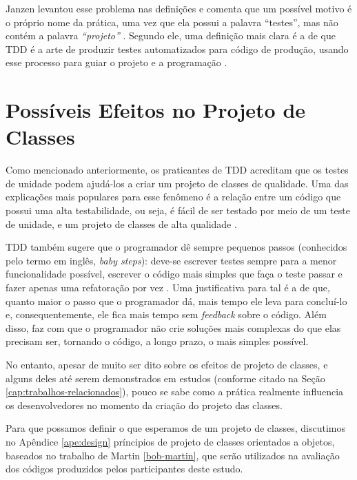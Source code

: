 Janzen levantou esse problema nas definições e comenta que um possível 
motivo é o próprio nome da prática, uma vez
que ela possui a palavra ``testes'', mas não contém a palavra \textit{``projeto''} 
\cite{tdd-really-improve}.
Segundo ele, uma definição mais clara é a de que TDD é a arte de produzir testes
automatizados para código de produção, usando esse processo para guiar o 
projeto e a programação \cite{agilealliance-tdd} \cite{tdd-taxonomy}.

\section{Possíveis Efeitos no Projeto de Classes}

Como mencionado anteriormente, os praticantes de TDD acreditam que os testes de unidade
podem ajudá-los a criar um projeto de classes de qualidade. Uma das explicações mais
populares para esse fenômeno é a relação
entre um código que possui uma alta testabilidade, ou seja, é fácil de ser testado
por meio de um teste de unidade, e um projeto de classes de alta qualidade \cite{feathers-synergy}.

TDD também sugere que o programador dê sempre pequenos passos (conhecidos pelo termo em
inglês, \textit{baby steps}): deve-se escrever testes sempre para a menor
funcionalidade possível, escrever o código mais simples que faça o teste passar
e fazer apenas uma refatoração por vez \cite{TDDByExample}.
Uma justificativa para tal é a de que, quanto maior o passo que o programador dá, mais
tempo ele leva para concluí-lo e, consequentemente, ele fica mais tempo
sem \textit{feedback} sobre o código. Além disso, faz com que o programador não crie
soluções mais complexas do que elas precisam ser, tornando o código, a longo
prazo, o mais simples possível.

No entanto, apesar de muito ser dito sobre os efeitos de projeto de classes, e alguns deles
até serem demonstrados em estudos (conforme citado na Seção \ref{cap:trabalhos-relacionados}), 
pouco se sabe como a prática realmente influencia os desenvolvedores no momento da criação do
projeto das classes.

Para que possamos definir o que esperamos de um projeto de classes,
discutimos no Apêndice \ref{ape:design}
príncipios de projeto de classes orientados a objetos, baseados no trabalho de
Martin \ref{bob-martin}, que serão utilizados na avaliação dos códigos
produzidos pelos participantes deste estudo.

